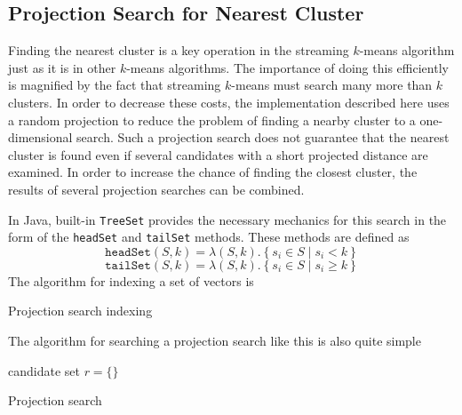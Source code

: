 \documentclass[11pt]{amsart}
\begin{document}
\subsection{Projection Search for Nearest Cluster}
Finding the nearest cluster is a key operation in the streaming $k$-means algorithm just as it is in other $k$-means algorithms.  The importance of doing this efficiently is magnified by the fact that streaming $k$-means must search many more than $k$ clusters.  In order to decrease these costs, the implementation described here uses a random projection to reduce the problem of finding a nearby cluster to a one-dimensional search.  Such a projection search does not guarantee that the nearest cluster is found even if several candidates with a short projected distance are examined.  In order to increase the chance of finding the closest cluster, the results of several projection searches can be combined. 

In Java, built-in {\tt TreeSet} provides the necessary mechanics for this search in the form of the {\tt headSet} and {\tt tailSet} methods.  These methods are defined as
\[
\mathtt{headSet}(S, k) = \lambda(S,k). \left\lbrace s_i \in S \mid s_i < k \right\rbrace
\]
\[
\mathtt{tailSet}(S, k) = \lambda (S,k). \left\lbrace s_i \in S \mid s_i \ge k \right\rbrace
\]
The algorithm for indexing a set of vectors is

\begin{algorithm}[H]
\SetNoFillComment
{}
\caption{Projection search indexing}
\end{algorithm}

The algorithm for searching a projection search like this is also quite simple

\begin{algorithm}[H]
\SetNoFillComment
{}
candidate set $r = \lbrace \rbrace$ \\
\caption{Projection search \label{projection-search}}
\end{algorithm}
\end{document}

